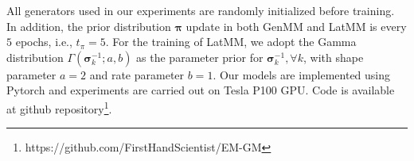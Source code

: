 All generators used in our experiments are randomly initialized before training. 
In addition, the prior distribution $\bm{\pi}$ update in both GenMM and LatMM is every $5$ epochs, {i.e.},  $t_{\pi} = 5$. For the training of LatMM, we adopt the Gamma distribution $\Gamma(\bm{\sigma}_k^{-1}; a, b)$ as the parameter prior for $\bm{\sigma}_k^{-1}, \forall k$, with shape parameter $a=2$ and rate parameter $b = 1$.
Our models are implemented using Pytorch and experiments are carried out on Tesla P100 GPU. Code is available at github repository\footnote{https://github.com/FirstHandScientist/EM-GM}.


